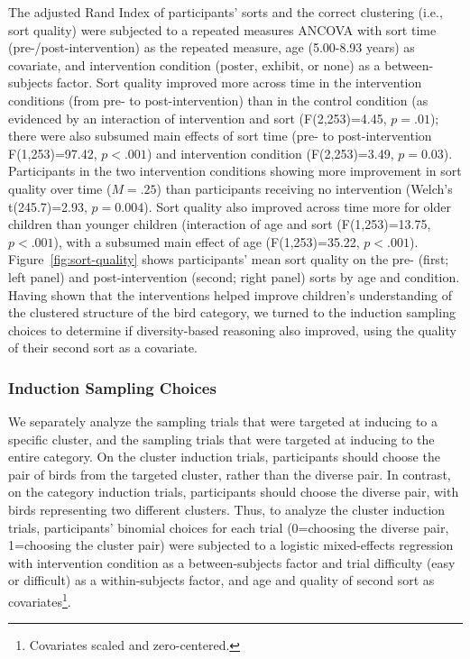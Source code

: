 \documentclass[10pt,letterpaper]{article}
\begin{document}
The adjusted Rand Index of participants' sorts and the correct clustering (i.e., sort quality) were subjected to a repeated measures ANCOVA with sort time (pre-/post-intervention) as the repeated measure, age (5.00-8.93 years) as covariate, and intervention condition (poster, exhibit, or none) as a between-subjects factor.
Sort quality improved more across time in the intervention conditions (from pre- to post-intervention) than in the control condition (as evidenced by an interaction of intervention and sort (F(2,253)=4.45, $p=.01$); there were also subsumed main effects of sort time (pre- to post-intervention F(1,253)=97.42, $p<.001$) and intervention condition (F(2,253)=3.49, $p=0.03$). 
Participants in the two intervention conditions showing more improvement in sort quality over time ($M=.25$) than participants receiving no intervention (Welch's t(245.7)=2.93, $p=0.004$). 
Sort quality also improved across time more for older children than younger children (interaction of age and sort (F(1,253)=13.75, $p<.001$), with a subsumed main effect of age (F(1,253)=35.22, $p<.001$).
Figure~\ref{fig:sort-quality} shows participants' mean sort quality on the pre- (first; left panel) and post-intervention (second; right panel) sorts by age and condition.
Having shown that the interventions helped improve children's understanding of the clustered structure of the bird category, we turned to the induction sampling choices to determine if diversity-based reasoning also improved, using the quality of their second sort as a covariate.



\subsubsection{Induction Sampling Choices}

We separately analyze the sampling trials that were targeted at inducing to a specific cluster, and the sampling trials that were targeted at inducing to the entire category. 
On the cluster induction trials, participants should choose the pair of birds from the targeted cluster, rather than the diverse pair. 
In contrast, on the category induction trials, participants should choose the diverse pair, with birds representing two different clusters.
Thus, to analyze the cluster induction trials, participants' binomial choices for each trial (0=choosing the diverse pair, 1=choosing the cluster pair) were subjected to a logistic mixed-effects regression with intervention condition as a between-subjects factor and trial difficulty (easy or difficult) as a within-subjects factor, and age and quality of second sort as covariates\footnote{Covariates scaled and zero-centered.}.
\end{document}
